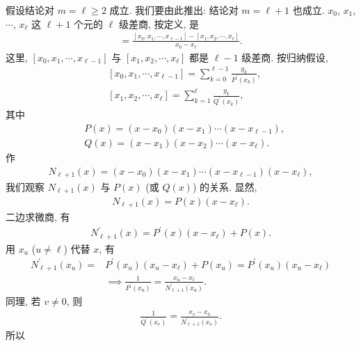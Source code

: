 \begin{pf}
    假设结论对 $m = \ell \geq 2$ 成立. 我们要由此推出: 结论对 $m = \ell + 1$ 也成立. $x_0$, $x_1$, $\cdots$, $x_{\ell}$ 这 $\ell + 1$ 个元的 $\ell$ 级差商, 按定义, 是
    \begin{align*}
        [x_{0}, x_{1}, \cdots, x_{\ell}] = \frac{[x_{0}, x_{1}, \cdots, x_{\ell - 1}] - [x_{1}, x_{2}, \cdots, x_{\ell}]}{x_0 - x_{\ell}}.
    \end{align*}
    这里, $[x_{0}, x_{1}, \cdots, x_{\ell - 1}]$ 与 $[x_{1}, x_{2}, \cdots, x_{\ell}]$ 都是 $\ell - 1$ 级差商. 按归纳假设,
    \begin{align*}
         & [x_{0}, x_{1}, \cdots, x_{\ell - 1}] = \sum_{k = 0}^{\ell-1} \frac{y_k}{P^{\prime} (x_k)}, \\
         & [x_{1}, x_{2}, \cdots, x_{\ell}] = \sum_{k = 1}^{\ell} \frac{y_k}{Q^{\prime} (x_k)},
    \end{align*}
    其中
    \begin{align*}
         & P(x) = (x - x_0) (x - x_1) \cdots (x - x_{\ell - 1}), \\
         & Q(x) = (x - x_1) (x - x_2) \cdots (x - x_{\ell}).
    \end{align*}
    作
    \begin{align*}
        N_{\ell + 1} (x) = (x - x_0) (x - x_1) \cdots (x - x_{\ell - 1}) (x - x_{\ell}),
    \end{align*}
    我们观察 $N_{\ell + 1} (x)$ 与 $P(x)$ (或 $Q(x)$) 的关系. 显然,
    \begin{align*}
        N_{\ell + 1} (x) = P(x) (x - x_{\ell}).
    \end{align*}
    二边求微商, 有
    \begin{align*}
        N_{\ell + 1}^{\prime} (x) = P^{\prime} (x) (x - x_{\ell}) + P(x).
    \end{align*}
    用 $x_u$ ($u \neq \ell$) 代替 $x$, 有
    \begin{align*}
        N_{\ell + 1}^{\prime} (x_u) = {} & P^{\prime} (x_u) (x_u - x_{\ell}) + P(x_u) = P^{\prime} (x_u) (x_u - x_{\ell})            \\
                                         & \implies \frac{1}{P^{\prime} (x_u)} = \frac{x_u - x_{\ell}}{N_{\ell + 1}^{\prime} (x_u)}.
    \end{align*}
    同理, 若 $v \neq 0$, 则
    \begin{align*}
        \frac{1}{Q^{\prime} (x_v)} = \frac{x_v - x_0}{N_{\ell + 1}^{\prime} (x_v)}.
    \end{align*}
    所以
    \begin{align*}

\end{align*}
\end{pf}
